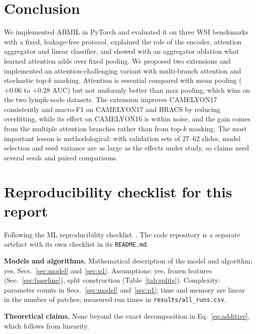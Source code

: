 \documentclass[conference]{IEEEtran}
\begin{document}
\section{Conclusion}
We implemented ABMIL in PyTorch and evaluated it on three WSI benchmarks with a fixed, leakage-free protocol, explained the role of the encoder, attention aggregator and linear classifier, and showed with an aggregator ablation what learned attention adds over fixed pooling. We proposed two extensions and implemented an attention-challenging variant with multi-branch attention and stochastic top-$k$ masking. Attention is essential compared with mean pooling ($+0.06$ to $+0.28$ AUC) but not uniformly better than max pooling, which wins on the two lymph-node datasets. The extension improves CAMELYON17 consistently and macro-F1 on CAMELYON17 and BRACS by reducing overfitting, while its effect on CAMELYON16 is within noise, and the gain comes from the multiple attention branches rather than from top-$k$ masking. The most important lesson is methodological: with validation sets of 27--62 slides, model selection and seed variance are as large as the effects under study, so claims need several seeds and paired comparisons.




\appendices
\section{Reproducibility checklist for this report}\label{app:checklist}
Following the ML reproducibility checklist~\cite{pineau2021reproducibility}. The code repository is a separate artefact with its own checklist in its \texttt{README.md}.

\smallskip\noindent\textbf{Models and algorithms.}
Mathematical description of the model and algorithm: yes, Secs.~\ref{sec:model} and~\ref{sec:p1}.
Assumptions: yes, frozen features (Sec.~\ref{sec:baseline}), split construction (Table~\ref{tab:splits}).
Complexity: parameter counts in Secs.~\ref{sec:model} and~\ref{sec:p1}; time and memory are linear in the number of patches; measured run times in \texttt{results/all\_runs.csv}.

\smallskip\noindent\textbf{Theoretical claims.} None beyond the exact decomposition in Eq.~\eqref{eq:additive}, which follows from linearity.
\end{document}
